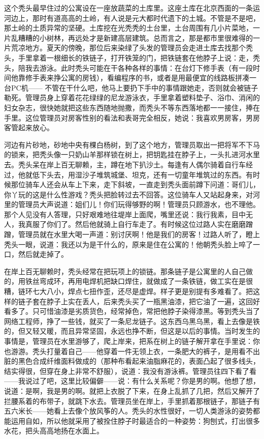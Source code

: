 这个秃头最早住过的公寓设在一座放蔬菜的土库里。这座土库在北京西面的一条运河边上，那时有道高高的土岭，有人说是元大都时代遗下的土城。不管是不是吧，那土岭的土质异常的坚硬。土库挖在光秃秃的土台里，土台周围有几小片菜地，一片乱糟糟的小树林，再远处才是新建高层建筑。总而言之，那是都市里很难得的一片荒凉地方。夏天的傍晚，那位后来染绿了头发的管理员会走进土库去找那个秃头，手里拿着一根细长的铁链子，打开铁笼的门，把铁链套在他脖子上说：走，秃头，陪我去游泳。此时秃头可能在干各种各样的事情：在台灯下修手表（有一段时间他靠修手表来挣公寓的房钱），看编程序的书，或者是用最便宜的线路板拼凑一台PC机—— 不管在干什么吧，他马上要扔下手中的事情跟她走，否则就会被链子勒死。管理员身上穿着花花绿绿的尼龙游泳衣，手里拿着塑料垫子、浴巾、消闲的妇女杂志，很快她就把这些东西随地抛撒，而秃头不等东西落地都一一接住，捧在手里。这位管理员对房客性别的看法和表哥完全相反，她说：我喜欢男房客，男房客管起来放心。 

河边有片砂地，砂地中央有棵白杨树，到了这个地方，管理员取出一把将军不下马的锁来，把秃头像一只奶山羊那样锁在树上，把钥匙挂在脖子上，一头扎进河水里去。秃头呆在岸上百无聊赖，主，蹲在地下扒沙土。每逢有人偶尔骑着自行车经过，他就低下头去，用湿沙子堆筑城堡、坦克，还有一切童年堆筑过的东西。有时候那位骑车人还会从车上下来，走下斜坡，一直走到秃头面前蹲下问道：哥们儿，你丫玩的这是什么性游戏？秃头把脸转过去不回答。这位骑车人又站起身来，对河里的管理员大声说道：姐们儿！你们玩得够野的啊！管理员只顾游水，也不理他。那个人见没有人答理，只好艰难地往堤岸上面爬，嘴里还说：我行我素，目中无人，我真服了你们了。然后他就骑上自行车走了。有时候这位过路人实在磨磨蹭蹭，管理员就在水里大喝一声道：别讨厌啊！他是我们的房客！过路人听了，瞪上秃头一眼，说道：我还以为是干什么的，原来是住在公寓的！他朝秃头脸上啐了一口，然后就走掉了。 

在岸上百无聊赖时，秃头经常在把玩项上的锁链。那条链子是公寓里的人自己做的，用铁丝弯成环，再用电焊机把缺口焊住，就做成了一条铁链，做工实在是很糟，链环七大八小，焊点七扭作歪，还尽是虚焊。样子更是别提有多难看了。把这样的链子套在脖子上实在丢人，后来秃头买了一瓶黑油漆，把它油了一遍，这回好看多了。只可惜油漆是劣质货色，经常掉色，常把他脖子染得漆黑。等到秃头当了网络工程师，挣了一些钱，就买了一条尼龙链子。这东西乌黑乌黑，看上去像是铁的，但又轻又暖，而且异常坚固，永远也挣不断，但这是以后的事情。当时发生的事情是，管理员在水里游够了，爬上岸来，把系在树上的链子解开拿在手里说：你也游游。秃头打量着自己——他穿着一件无领上衣，一条肥大的裤子，是用看不出脏的黑色合成纤维面料做成的（那种布看起来油脂麻花的，表面凸起了很多线头，结实得很，但穿在身上非常不舒服），说道：我没有游泳裤。管理员往四下看了看——我说过了吧，这里比较偏僻——说：有什么关系呢？你是男的啊。他想了想，说道：是啊，我是男的啊。就把上衣脱了下来，在身上乱抓了几把，然后又解开了拦腰系着的布带子，就跳下水去。管理员坐在岸上，手里抓着那根链子，那链子有五六米长——她看上去像个放风筝的人。秃头的水性很好，一切人类游泳的姿势都能运用自如，所以他就采用了被拴住脖子时最适合的一种姿势：狗刨式，打出很多水花，把头高高地扬在水面上。 

